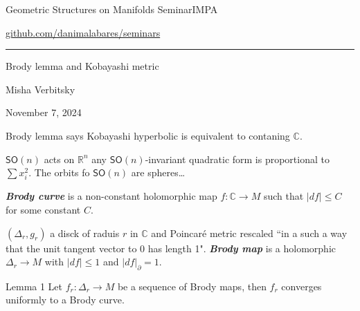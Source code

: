 


\begin{minipage}{\textwidth}
	\begin{minipage}{1\textwidth}
		Geometric Structures on Manifolds Seminar\hfill IMPA
		
		{\small\hfill\href{https://github.com/danimalabares/seminars}{github.com/danimalabares/seminars}}
		
	\end{minipage}
\end{minipage}\vspace{.2cm}\hrule

\vspace{10pt}

{\Huge Brody lemma and Kobayashi metric}

\hfill{\Large Misha Verbitsky}

\hfill{\large November 7, 2024}

\tableofcontents
\begin{upshot}\leavevmode
	Brody lemma says Kobayashi hyperbolic is equivalent to contaning $\mathbb{C}$.
\end{upshot}
$\mathsf{SO}(n)$ acts on $\mathbb{R}^n$ any $\mathsf{SO}(n)$-invariant quadratic form is proportional to $\sum x_i^2$. The orbits fo $\mathsf{SO}(n)$ are spheres…

\begin{defn}\leavevmode
	\textit{\textbf{Brody curve}} is a non-constant holomorphic map $f:\mathbb{C}\to M$ such that $|df|\leq C$ for some constant $C$.
\end{defn}

\begin{defn}\leavevmode
	$(\Delta_r,g_r)$ a disck of raduis $r$ in $\mathbb{C}$ and Poincaré metric rescaled ``in a such a way that the unit tangent vector to 0 has length 1". \textit{\textbf{Brody map}} is a holomorphic $\Delta_r \to M$ with $|df|\leq 1$ and $|df|_\partial=1$.
\end{defn}

\begin{thing4}{Lemma 1}\leavevmode
Let $f_r:\Delta_r \to M$ be a sequence of Brody maps, then $f_r$ converges uniformly to a Brody curve.
\end{thing4}


